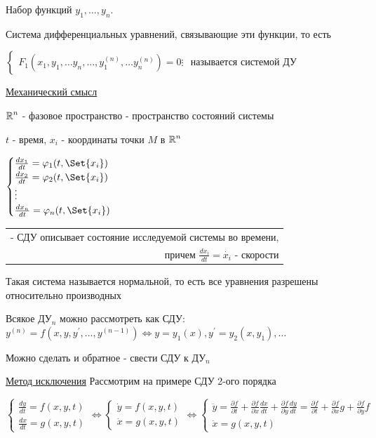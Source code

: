 \documentclass[12pt]{article}
\begin{document}
    \Def Набор функций $\displaystyle y_1, \dots, y_n$.

    Система дифференциальных уравнений, связывающие эти функции, то есть

    $\displaystyle \begin{cases}
         F_1(x_1, y_1, \dots y_n, \dots, y_1^{(n)}, \dots y_n^{(n)}) = 0
         \vdots
    \end{cases}$ называется системой ДУ

    \vspace{5mm}

    \underline{Механический смысл}

    $\displaystyle \mathbb{R}^n$ - фазовое пространство - пространство состояний системы

    $t$ - время, $\displaystyle x_i$ - координаты точки $M$ в $\displaystyle \mathbb{R}^n$

    $\displaystyle \begin{cases}
         \frac{dx_1}{dt} = \varphi_1(t, \Set{x_i}) \\
         \frac{dx_2}{dt} = \varphi_2(t, \Set{x_i}) \\
         \vdots \\
         \frac{dx_n}{dt} = \varphi_n(t, \Set{x_i}) \\
    \end{cases}$ \begin{tabular}{r} - СДУ описывает состояние исследуемой системы во времени, \\ причем $\displaystyle \frac{dx_i}{dt} = \dot{x_i}$ - скорости \end{tabular}

    \Nota Такая система называется нормальной, то есть все уравнения разрешены относительно производных

    \Nota Всякое ДУ$\displaystyle _n$ можно рассмотреть как СДУ: $\displaystyle y^{(n)} = f(x, y, y^\prime, \dots, y^{(n - 1)}) \Longleftrightarrow y = y_1(x), y^\prime = y_2(x, y_1), \dots$

    Можно сделать и обратное - свести СДУ к ДУ$\displaystyle _n$

    \underline{Метод исключения} Рассмотрим на примере СДУ 2-ого порядка

    $\displaystyle \begin{cases}
         \frac{dy}{dt} = f(x, y, t) \\
         \frac{dx}{dt} = g(x, y, t)
    \end{cases} \Longleftrightarrow \begin{cases}
         \dot{y} = f(x, y, t) \\
         \dot{x} = g(x, y, t)
    \end{cases} \Longleftrightarrow \begin{cases}
         \ddot y = \frac{\partial f}{\partial t} + \frac{\partial f}{\partial x}\frac{dx}{dt} + \frac{\partial f}{\partial y}\frac{dy}{dt} = \frac{\partial f}{\partial t} + \frac{\partial f}{\partial x}g + \frac{\partial f}{\partial y}f \\
         \dot{x} = g(x, y, t)
    \end{cases}$
\end{document}
